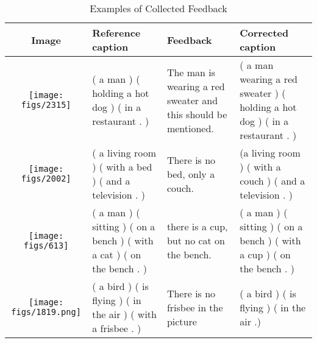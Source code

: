 \begin{table}[H]
\vspace{-2mm}
  \centering
  \begin{tabular}{ | c | m{3.0cm}| m{3.2cm}| m{3.0cm}| }
    \hline
    Image &  Reference caption & Feedback &  Corrected caption\\ \hline
    
    \begin{minipage}{.20\textwidth}
      \vspace{1.mm}
      \texttt{[image: figs/2315]}
      \vspace{-3mm}
    \end{minipage}
    
    &
    ( a man ) ( holding a hot dog ) ( in a restaurant . )
    & 

      The man is wearing a red sweater and this should be mentioned.
    & 
       ( a man  wearing a red sweater ) ( holding a hot dog ) ( in a restaurant . )
    \\ \hline


        \begin{minipage}{.20\textwidth}
      \vspace{1.mm}
      \texttt{[image: figs/2002]}
      \vspace{-3mm}
    \end{minipage}
    
    &
    ( a living room ) ( with a bed ) ( and a television . )
    & 
       There is no bed, only a couch.
    & 
        (a living room ) ( with a couch ) ( and a television . )
    \\ \hline


        \begin{minipage}{.20\textwidth}
      \vspace{1.mm}
      \texttt{[image: figs/613]}
     \vspace{-3mm}
    \end{minipage}
    
    &
    ( a man ) ( sitting ) ( on a bench ) ( with a cat ) ( on the bench . )
    & 
       there is a cup, but no cat on the bench.
    & 
      ( a man ) ( sitting ) ( on a bench ) ( with a cup ) ( on the bench . )
    \\ \hline



        \begin{minipage}{.20\textwidth}
      \vspace{1.mm}
      \texttt{[image: figs/1819.png]}
    \vspace{-2.8mm}
    \end{minipage}
    
    &
    ( a bird ) ( is flying ) ( in the air ) ( with a frisbee . )

    & 
      There is no frisbee in the picture
    & 
      ( a bird ) ( is flying ) ( in the air .)
    \\ \hline

  \end{tabular}
  \caption{Examples of Collected Feedback}\label{tbl:myLboro}
\end{table}
